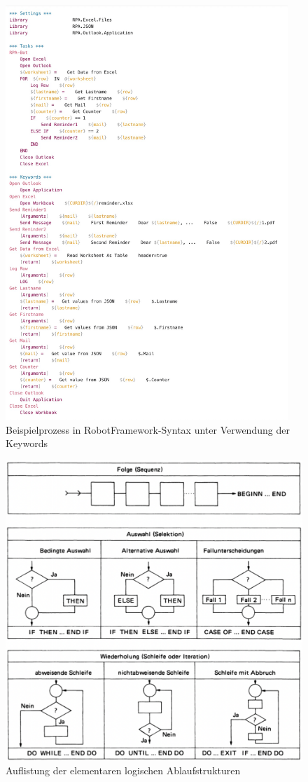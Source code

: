 \begin{figure}[h!]
    \centering
    \includegraphics[width=0.95\textwidth]{Bachelorarbeit/images/exampleBotKeywords2.png}
    \caption{Beispielprozess in RobotFramework-Syntax unter Verwendung der Keywords}
    \label{fig:ScrRobotFrKeywords}
\end{figure}

\begin{figure}[h!]
    \centering
    \includegraphics[width=1.0\textwidth]{Bachelorarbeit/images/AnhangUebersichtFlowchart.pdf}
    \caption{Auflistung der elementaren logischen Ablaufstrukturen}
    \label{fig:UebersichtFlowchart}
\end{figure}